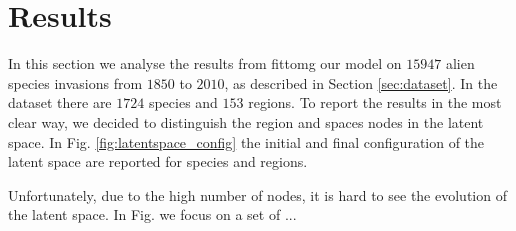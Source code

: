 \documentclass[mscthesis]{usiinfthesis}
\begin{document}
%

\chapter{Results}

In this section we analyse the results from fittomg our model on $15947$ alien species invasions from $1850$ to $2010$, as described in Section \ref{sec:dataset}. In the dataset there are $1724$ species and $153$ regions. To report the results in the most clear way, we decided to distinguish the region and spaces nodes in the latent space. In Fig. \ref{fig:latentspace_config} the initial and final configuration of the latent space are reported for species and regions. 

Unfortunately, due to the high number of nodes, it is hard to see the evolution of the latent space. In Fig. we focus on a set of ...
\end{document}
